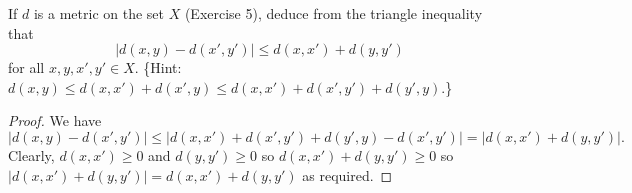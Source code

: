 \begin{tcolorbox}[title=Problem 7, breakable]
If $d$ is a metric on the set $X$ (Exercise 5), deduce from the triangle inequality that
\[
    |d(x,y) - d(x',y')| \leq d(x,x') + d(y,y')
\]
for all $x, y, x', y' \in X$. \{Hint: $d(x,y) \leq d(x,x') + d(x',y) \leq d(x,x') + d(x',y') + d(y',y)$.\}
\end{tcolorbox}


\begin{proof}
    We have
    \[|d(x,y) - d(x',y')| \le |d(x,x') + d(x',y') + d(y',y) - d(x',y')| = |d(x, x') + d(y, y')|.\]
    Clearly, $d(x, x') \ge 0$ and $d(y, y') \ge 0$ so $d(x, x') + d(y, y') \ge 0$ so 
    $|d(x, x') + d(y, y')| = d(x, x') + d(y, y')$ as required.
\end{proof}